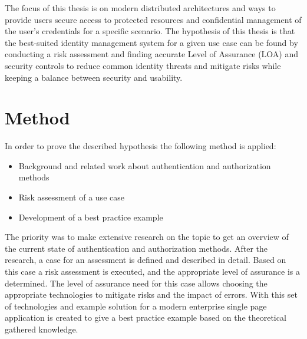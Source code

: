 The focus of this thesis is on modern distributed architectures and ways to provide users secure access to protected resources and confidential management of the user’s credentials for a specific scenario. The hypothesis of this thesis is that the best-suited identity management system for a given use case can be found by conducting a risk assessment and finding accurate Level of Assurance (LOA) and security controls to reduce common identity threats and mitigate risks while keeping a balance between security and usability.

\section{Method}

In order to prove the described hypothesis the following method is applied:

\begin{itemize}
	\item Background and related work about authentication and authorization methods
	\item Risk assessment of a use case
	\item Development of a best practice example
\end{itemize}

The priority was to make extensive research on the topic to get an overview of the current state of authentication and authorization methods. After the research, a case for an assessment is defined and described in detail. Based on this case a risk assessment is executed, and the appropriate level of assurance is a determined. The level of assurance need for this case allows choosing the appropriate technologies to mitigate risks and the impact of errors. With this set of technologies and example solution for a modern enterprise single page application is created to give a best practice example based on the theoretical gathered knowledge.


\chapterend
